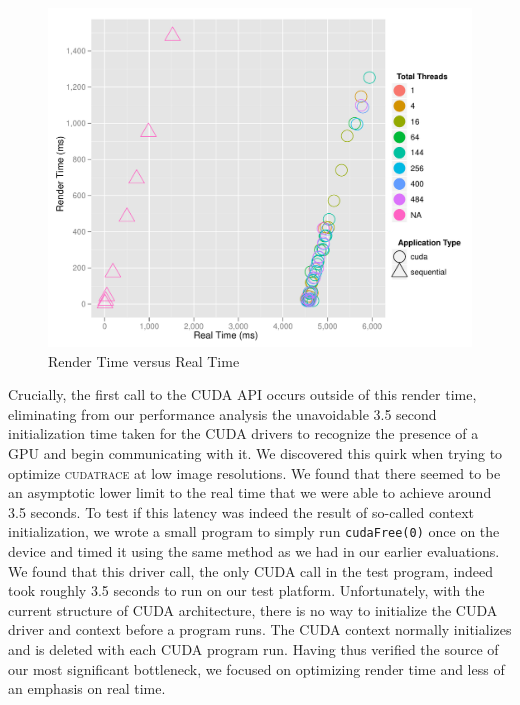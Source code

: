 \documentclass[12pt]{article}
\begin{document}
\begin{figure}
    \caption{Render Time versus Real Time} \label{fig:render_vs_real}
    \begin{center}
\includegraphics{cudatrace-005}
    \end{center}
\end{figure}


Crucially, the first call to the CUDA API occurs outside of this render time, eliminating from our performance analysis the unavoidable 3.5 second initialization time taken for the CUDA drivers to recognize the presence of a GPU and begin communicating with it. We discovered this quirk when trying to optimize \textsc{cudatrace} at low image resolutions. We found that there seemed to be an asymptotic lower limit to the real time that we were able to achieve around 3.5 seconds. To test if this latency was indeed the result of so-called context initialization, we wrote a small program to simply run \texttt{cudaFree(0)} once on the device and timed it using the same method as we had in our earlier evaluations. We found that this driver call, the only CUDA call in the test program, indeed took roughly 3.5 seconds to run on our test platform. Unfortunately, with the current structure of CUDA architecture, there is no way to initialize the CUDA driver and context before a program runs. The CUDA context normally initializes and is deleted with each CUDA program run. Having thus verified the source of our most significant bottleneck, we focused on optimizing render time and less of an emphasis on real time.
\end{document}
